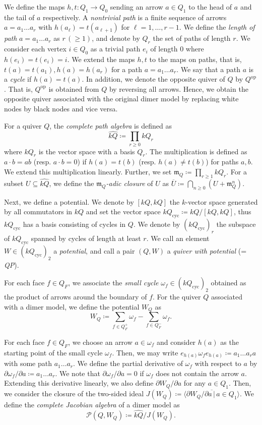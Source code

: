 \documentclass[11pt]{amsart}
\theoremstyle{definition}
\newcommand{\calP}{\mathcal{P}}
\newcommand{\fkm}{\mathfrak{m}}
\DeclareMathOperator{\op}{op}
\begin{document}
We define the maps $h, t:Q_1\rightarrow Q_0$ sending an arrow $a\in Q_1$ to the head of $a$ and the tail of $a$ respectively. A \emph{nontrivial path} is a finite sequence of arrows $a=a_1\dots a_r$ with $h(a_\ell)=t(a_{\ell+1})$ for $\ell=1, \dots ,r-1$. We define the \emph{length of path} $a=a_1\dots a_r$ as $r \,(\ge 1)$, and denote by $Q_r$ the set of paths of length $r$. We consider each vertex $i\in Q_0$ as a trivial path $e_i$ of length $0$ where $h(e_i)=t(e_i)=i$. We extend the maps $h, t$ to the maps on paths, that is, $t(a)=t(a_1), h(a)=h(a_r)$ for a path $a=a_1\dots a_r$. We say that a path $a$ is a \emph{cycle} if $h(a)=t(a)$. In addition, we denote the opposite quiver of $Q$ by $Q^{\op}$. That is, $Q^{\op}$ is obtained from $Q$ by reversing all arrows. Hence, we obtain the opposite quiver associated with the original dimer model by replacing white nodes by black nodes and vice versa.

For a quiver $Q$, the \emph{complete path algebra} is defined as
\[
\widehat{kQ}\coloneqq\prod_{r\ge 0}kQ_r
\]
where $kQ_r$ is the vector space with a basis $Q_r$. The multiplication is defined as $a\cdot b=ab$ (resp. $a\cdot b=0$) if $h(a)=t(b)$ (resp. $h(a)\neq t(b)$) for paths $a, b$. We extend this multiplication linearly. Further, we set $\fkm_Q\coloneqq \prod_{r\ge 1}kQ_r$. For a subset $U\subseteq\widehat{kQ}$, we define the \emph{$\fkm_Q$-adic closure} of $U$ as $\overline{U}\coloneqq \bigcap_{n\ge 0}(U+\fkm_Q^n)$.

Next, we define a potential. We denote by $[kQ, kQ]$ the $k$-vector space generated by all commutators in $kQ$ and set the vector space $kQ_{\mathrm{cyc}}\coloneqq kQ/[kQ, kQ]$, thus $kQ_{\mathrm{cyc}}$ has a basis consisting of cycles in $Q$. We denote by $(kQ_{\mathrm{cyc}})_r$ the subspace of $kQ_{\mathrm{cyc}}$ spanned by cycles of length at least $r$. We call an element $W\in (kQ_{\mathrm{cyc}})_2$ a \emph{potential}, and call a pair $(Q,W)$ a \emph{quiver with potential} (= \emph{QP}).

For each face $f\in Q_F$, we associate the \emph{small cycle} $\omega_f\in (kQ_{\mathrm{cyc}})_2$ obtained as the product of arrows around the boundary of $f$. For the quiver $Q$ associated with a dimer model, we define the potential $W_Q$ as
\[
W_Q\coloneqq \sum_{f\in Q^+_F}\omega_f-\sum_{f\in Q^-_F}\omega_f.
\]

For each face $f\in Q_F$, we choose an arrow $a\in \omega_f$ and consider $h(a)$ as the starting point of the small cycle $\omega_f$. Then, we may write $e_{h(a)}\omega_fe_{h(a)}\coloneqq a_1\dots a_ra$ with some path $a_1\dots a_r$. We define the partial derivative of $\omega_f$ with respect to $a$ by $\partial \omega_f/\partial a\coloneqq a_1\dots a_r$. We note that $\partial \omega_f/\partial a=0$ if $\omega_f$ does not contain the arrow $a$. Extending this derivative linearly, we also define $\partial W_Q/\partial a$ for any $a\in Q_1$. Then, we consider the closure of the two-sided ideal $J(W_Q)\coloneqq \langle\overline{\partial W_Q/\partial a\,|\,a\in Q_1}\rangle$. We define the \emph{complete Jacobian algebra} of a dimer model as
\[
\calP(Q, W_Q)\coloneqq \widehat{kQ}/J(W_Q).
\]
\end{document}
